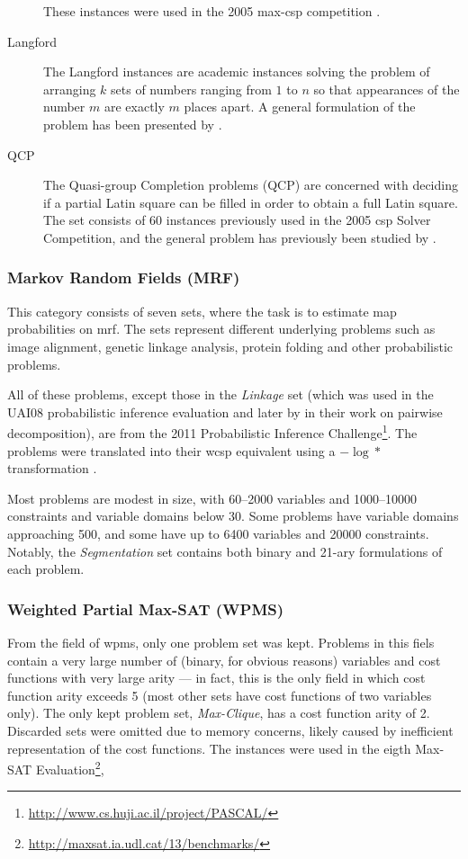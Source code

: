 \begin{description}
		These instances were used in the 2005 max-\gls{csp} competition \parencite{Boussemart05}.
	\item[Langford]
		The Langford instances are academic instances solving the problem of arranging \(k\) sets of numbers ranging from \(1\) to \(n\) so that appearances of the number \(m\) are exactly \(m\) places apart.
		A general formulation of the problem has been presented by \textcite{Linek03}.
	\item[QCP]
		The Quasi-group Completion problems (QCP) are concerned with deciding if a partial Latin square can be filled in order to obtain a full Latin square.
		The set consists of 60 instances previously used in the 2005 \gls{csp} Solver Competition, and the general problem has previously been studied by \textcite{Gomes02}.
\end{description}

\subsubsection{Markov Random Fields (MRF)}
This category consists of seven sets, where the task is to estimate \gls{map} probabilities on \gls{mrf}. The sets represent different underlying problems such as image alignment, genetic linkage analysis, protein folding and other probabilistic problems.

All of these problems, except those in the \emph{Linkage} set (which was used in the UAI08 probabilistic inference evaluation and later by \textcite{Favier11} in their work on pairwise decomposition), are from the 2011 Probabilistic Inference Challenge\footnote{\url{http://www.cs.huji.ac.il/project/PASCAL/}}.
The problems were translated into their \gls{wcsp} equivalent using a \(-\log*{}\) transformation \parencite[\pno~4]{deGivry14}.

Most problems are modest in size, with \numrange{60}{2000} variables and \numrange{1000}{10000} constraints and variable domains below \num{30}. 
Some problems have variable domains approaching \num{500}, and some have up to \num{6400} variables and \num{20000} constraints.
Notably, the \emph{Segmentation} set contains both binary and 21-ary formulations of each problem.


\subsubsection{Weighted Partial Max-SAT (WPMS)}
From the field of \gls{wpms}, only one problem set was kept.
Problems in this fiels contain a very large number of (binary, for obvious reasons) variables and cost functions with very large arity --- in fact, this is the only field in which cost function arity exceeds \num{5} (most other sets have cost functions of two variables only).
The only kept problem set, \emph{Max-Clique}, has a cost function arity of \num{2}.
Discarded sets were omitted due to memory concerns, likely caused by inefficient representation of the cost functions.
The instances were used in the eigth Max-SAT Evaluation\footnote{\url{http://maxsat.ia.udl.cat/13/benchmarks/}},

